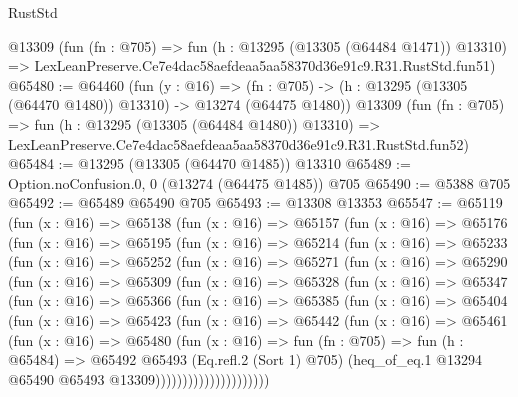 \begin{lexlean}{RustStd}
\begin{coremodule}
    @13309
    (fun (fn : @705) =>
    fun (h : @13295 (@13305 (@64484 @1471)) @13310) =>
    LexLeanPreserve.Ce7e4dac58aefdeaa5aa58370d36e91c9.R31.RustStd.fun51)
@65480 := @64460
    (fun (y : @16) =>
    (fn : @705) -> (h : @13295 (@13305 (@64470 @1480)) @13310) -> @13274 (@64475 @1480))
    @13309
    (fun (fn : @705) =>
    fun (h : @13295 (@13305 (@64484 @1480)) @13310) =>
    LexLeanPreserve.Ce7e4dac58aefdeaa5aa58370d36e91c9.R31.RustStd.fun52)
@65484 := @13295 (@13305 (@64470 @1485)) @13310
@65489 := Option.noConfusion.{0, 0} (@13274 (@64475 @1485)) @705
@65490 := @5388 @705
@65492 := @65489 @65490 @705
@65493 := @13308 @13353
@65547 := @65119
    (fun (x : @16) =>
    @65138
      (fun (x : @16) =>
      @65157
        (fun (x : @16) =>
        @65176
          (fun (x : @16) =>
          @65195
            (fun (x : @16) =>
            @65214
              (fun (x : @16) =>
              @65233
                (fun (x : @16) =>
                @65252
                  (fun (x : @16) =>
                  @65271
                    (fun (x : @16) =>
                    @65290
                      (fun (x : @16) =>
                      @65309
                        (fun (x : @16) =>
                        @65328
                          (fun (x : @16) =>
                          @65347
                            (fun (x : @16) =>
                            @65366
                              (fun (x : @16) =>
                              @65385
                                (fun (x : @16) =>
                                @65404
                                  (fun (x : @16) =>
                                  @65423
                                    (fun (x : @16) =>
                                    @65442
                                      (fun (x : @16) =>
                                      @65461
                                        (fun (x : @16) =>
                                        @65480
                                          (fun (x : @16) =>
                                          fun (fn : @705) =>
                                          fun (h : @65484) =>
                                          @65492
                                            @65493
                                            (Eq.refl.{2} (Sort 1) @705)
                                            (heq_of_eq.{1}
                                              @13294
                                              @65490
                                              @65493
                                              @13309)))))))))))))))))))))

\end{coremodule}
\end{lexlean}
